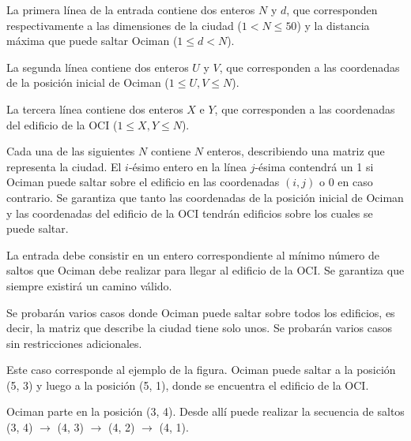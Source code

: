 \documentclass{oci}
\begin{document}
\begin{inputDescription}
La primera línea de la entrada contiene dos enteros $N$ y $d$, que corresponden
respectivamente a las dimensiones de la ciudad ($1 < N \leq 50$) y la distancia máxima
que puede saltar Ociman ($1 \le d < N$).

La segunda línea contiene dos enteros $U$ y $V$, que corresponden a las
coordenadas de la posición inicial de Ociman ($1 \le U, V \le N$).

La tercera línea contiene dos enteros $X$ e $Y$, que corresponden a las
coordenadas del edificio de la OCI ($1 \le X, Y \le N$).

Cada una de las siguientes $N$ contiene $N$ enteros, describiendo una matriz que
representa la ciudad.
El $i$-ésimo entero en la línea $j$-ésima contendrá un 1 si Ociman puede saltar
sobre el edificio en las coordenadas $(i, j)$ o 0 en caso contrario.
Se garantiza que tanto las coordenadas de la posición inicial de Ociman y las
coordenadas del edificio de la OCI tendrán edificios sobre los cuales se
puede saltar.
\end{inputDescription}

\begin{outputDescription}
La entrada debe consistir en un entero correspondiente al mínimo número de saltos
que Ociman debe realizar para llegar al edificio de la OCI.
Se garantiza que siempre existirá un camino válido.
\end{outputDescription}

\begin{scoreDescription}
   Se probarán varios casos donde Ociman puede saltar sobre todos los
  edificios, es decir, la matriz que describe la ciudad tiene solo unos.
   Se probarán varios casos sin restricciones adicionales.
\end{scoreDescription}

\begin{sampleDescription}
Este caso corresponde al ejemplo de la figura.
Ociman puede saltar a la posición (5, 3) y luego a la posición (5, 1), donde se encuentra el edificio de la OCI.

Ociman parte en la posición (3, 4).
Desde allí puede realizar la secuencia de saltos (3, 4) $\rightarrow$ (4, 3) $\rightarrow$ (4, 2) $\rightarrow$ (4, 1).

\end{sampleDescription}
\end{document}
